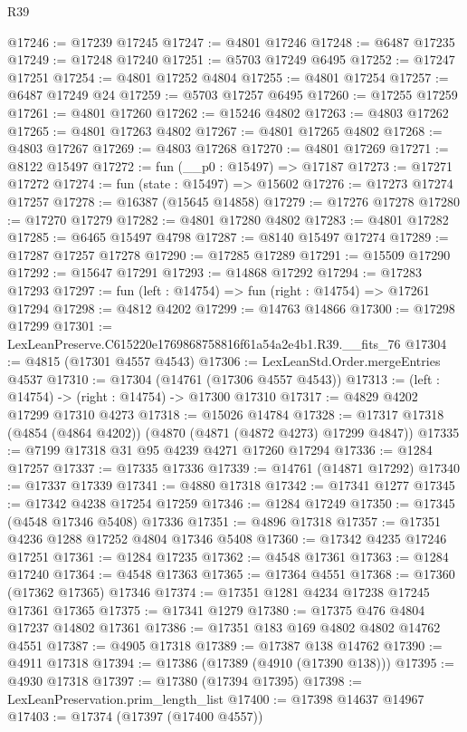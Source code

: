 \begin{lexlean}{R39}
\begin{coremodule}
@17246 := @17239 @17245
@17247 := @4801 @17246
@17248 := @6487 @17235
@17249 := @17248 @17240
@17251 := @5703 @17249 @6495
@17252 := @17247 @17251
@17254 := @4801 @17252 @4804
@17255 := @4801 @17254
@17257 := @6487 @17249 @24
@17259 := @5703 @17257 @6495
@17260 := @17255 @17259
@17261 := @4801 @17260
@17262 := @15246 @4802
@17263 := @4803 @17262
@17265 := @4801 @17263 @4802
@17267 := @4801 @17265 @4802
@17268 := @4803 @17267
@17269 := @4803 @17268
@17270 := @4801 @17269
@17271 := @8122 @15497
@17272 := fun (__p0 : @15497) => @17187
@17273 := @17271 @17272
@17274 := fun (state : @15497) => @15602
@17276 := @17273 @17274 @17257
@17278 := @16387 (@15645 @14858)
@17279 := @17276 @17278
@17280 := @17270 @17279
@17282 := @4801 @17280 @4802
@17283 := @4801 @17282
@17285 := @6465 @15497 @4798
@17287 := @8140 @15497 @17274
@17289 := @17287 @17257 @17278
@17290 := @17285 @17289
@17291 := @15509 @17290
@17292 := @15647 @17291
@17293 := @14868 @17292
@17294 := @17283 @17293
@17297 := fun (left : @14754) => fun (right : @14754) => @17261 @17294
@17298 := @4812 @4202
@17299 := @14763 @14866
@17300 := @17298 @17299
@17301 := LexLeanPreserve.C615220e1769868758816f61a54a2e4b1.R39.__fits_76
@17304 := @4815 (@17301 @4557 @4543)
@17306 := LexLeanStd.Order.mergeEntries @4537
@17310 := @17304 (@14761 (@17306 @4557 @4543))
@17313 := (left : @14754) -> (right : @14754) -> @17300 @17310
@17317 := @4829 @4202 @17299 @17310 @4273
@17318 := @15026 @14784
@17328 := @17317 @17318 (@4854 (@4864 @4202)) (@4870 (@4871 (@4872 @4273) @17299 @4847))
@17335 := @7199 @17318 @31 @95 @4239 @4271 @17260 @17294
@17336 := @1284 @17257
@17337 := @17335 @17336
@17339 := @14761 (@14871 @17292)
@17340 := @17337 @17339
@17341 := @4880 @17318
@17342 := @17341 @1277
@17345 := @17342 @4238 @17254 @17259
@17346 := @1284 @17249
@17350 := @17345 (@4548 @17346 @5408) @17336
@17351 := @4896 @17318
@17357 := @17351 @4236 @1288 @17252 @4804 @17346 @5408
@17360 := @17342 @4235 @17246 @17251
@17361 := @1284 @17235
@17362 := @4548 @17361
@17363 := @1284 @17240
@17364 := @4548 @17363
@17365 := @17364 @4551
@17368 := @17360 (@17362 @17365) @17346
@17374 := @17351 @1281 @4234 @17238 @17245 @17361 @17365
@17375 := @17341 @1279
@17380 := @17375 @476 @4804 @17237 @14802 @17361
@17386 := @17351 @183 @169 @4802 @4802 @14762 @4551
@17387 := @4905 @17318
@17389 := @17387 @138 @14762
@17390 := @4911 @17318
@17394 := @17386 (@17389 (@4910 (@17390 @138)))
@17395 := @4930 @17318
@17397 := @17380 (@17394 @17395)
@17398 := LexLeanPreservation.prim_length_list
@17400 := @17398 @14637 @14967
@17403 := @17374 (@17397 (@17400 @4557))

\end{coremodule}
\end{lexlean}
